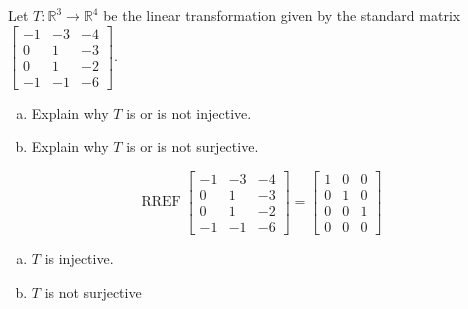 
\begin{exerciseStatement}
 Let \(T:\mathbb{R}^ 3  \to \mathbb{R}^ 4 \) be the linear transformation given by the standard matrix \( \left[\begin{array}{ccc}
-1 & -3 & -4 \\
0 & 1 & -3 \\
0 & 1 & -2 \\
-1 & -1 & -6
\end{array}\right] .\)
\begin{enumerate}[(a)]
\item Explain why \(T\) is or is not injective.
\item Explain why \(T\) is or is not surjective.
\end{enumerate}
    
\end{exerciseStatement}
    
\begin{exerciseAnswer} 


\[\operatorname{RREF} \left[\begin{array}{ccc}
-1 & -3 & -4 \\
0 & 1 & -3 \\
0 & 1 & -2 \\
-1 & -1 & -6
\end{array}\right] = \left[\begin{array}{ccc}
1 & 0 & 0 \\
0 & 1 & 0 \\
0 & 0 & 1 \\
0 & 0 & 0
\end{array}\right] \]


\begin{enumerate}[(a)]
\item \(T\) is injective.
\item \(T\) is not surjective
\end{enumerate}
    
\end{exerciseAnswer}
    
